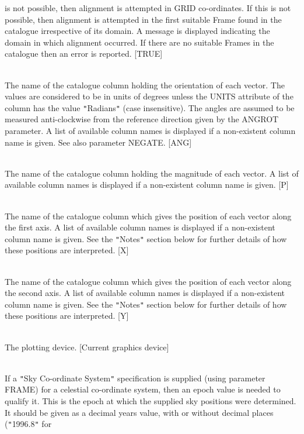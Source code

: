 \documentclass[twoside,11pt]{article}
\renewcommand{\_}{\texttt{\symbol{95}}}
\newcommand{\sstsubsection}[1]{ \item[{#1}] \mbox{} \\}
\newcommand{\sstsubsection}[1]{\item[{#1}]}
\begin{document}
{{{         is not possible, then alignment is attempted in GRID co-ordinates. If
         this is not possible, then alignment is attempted in the first
         suitable Frame found in the catalogue irrespective of its domain.
         A message is displayed indicating the domain in which alignment
         occurred. If there are no suitable Frames in the catalogue then an
         error is reported. [TRUE]
      }
      \sstsubsection{
         COLANG = LITERAL (Read)
      }{
         The name of the catalogue column holding the orientation of each
         vector. The values are considered to be in units of degrees unless
         the UNITS attribute of the column has the value {\tt "}Radians{\tt "} (case
         insensitive).  The angles are assumed to be measured anti-clockwise
         from the reference direction given by the ANGROT parameter. A list
         of available column names is displayed if a non-existent column name
         is given. See also parameter NEGATE. [ANG]
      }
      \sstsubsection{
         COLMAG = LITERAL (Read)
      }{
         The name of the catalogue column holding the magnitude of each
         vector. A list of available column names is displayed if a
         non-existent column name is given. [P]
      }
      \sstsubsection{
         COLX = LITERAL (Read)
      }{
         The name of the catalogue column which gives the position of each
         vector along the first axis. A list of available column names is
         displayed if a non-existent column name is given. See the {\tt "}Notes{\tt "}
         section below for further details of how these positions are
         interpreted. [X]
      }
      \sstsubsection{
         COLY = LITERAL (Read)
      }{
         The name of the catalogue column which gives the position of each
         vector along the second axis. A list of available column names is
         displayed if a non-existent column name is given. See the {\tt "}Notes{\tt "}
         section below for further details of how these positions are
         interpreted. [Y]
      }
      \sstsubsection{
         DEVICE = DEVICE (Read)
      }{
         The plotting device. [Current graphics device]
      }
      \sstsubsection{
         EPOCH = \_DOUBLE (Read)
      }{
         If a {\tt "}Sky Co-ordinate System{\tt "} specification is supplied (using
         parameter FRAME) for a celestial co-ordinate system, then an epoch
         value is needed to qualify it. This is the epoch at which the
         supplied sky positions were determined. It should be given as a
         decimal years value, with or without decimal places  ({\tt "}1996.8{\tt "} for
}}}
\end{document}
